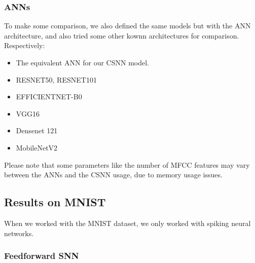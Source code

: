 \documentclass[11pt]{article}
\begin{document}
\subsubsection{ANNs}

To make some comparison, we also defined the same models but with the ANN architecture, and also tried some other kownn architectures for comparison. Respectively: 

\begin{itemize}
  \item The equivalent ANN for our CSNN model. 
  \item RESNET50, RESNET101
  \item EFFICIENTNET-B0
  \item VGG16
  \item Densenet 121
  \item MobileNetV2
\end{itemize}

Please note that some parameters like the number of MFCC features may vary between the ANNs and the CSNN usage, due to memory usage issues.

\pagebreak

\subsection{Results on MNIST}

When we worked with the MNIST dataset, we only worked with spiking neural networks.

\subsubsection*{Feedforward SNN}
\end{document}
